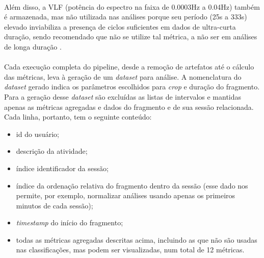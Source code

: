             \paragraph{} Além disso, a VLF (potência do espectro na faixa de 0.0003Hz a 0.04Hz) também é armazenada, mas não utilizada nas análises porque seu período (25s a 333s) elevado inviabiliza a presença de ciclos suficientes em dados de ultra-curta duração, sendo recomendado que não se utilize tal métrica, a não ser em análises de longa duração \cite{TaskForceoftheEuropeanSocietyofCardiologytheNorthAmericanSocietyofPacing1996HeartUse}.
        
           \paragraph{} Cada execução completa do pipeline, desde a remoção de artefatos até o cálculo das métricas, leva à geração de um \textit{dataset} para análise. A nomenclatura do \textit{dataset} gerado indica os parâmetros escolhidos para \textit{crop} e duração do fragmento. Para a geração desse \textit{dataset} são excluídas as listas de intervalos e mantidas apenas as métricas agregadas e dados do fragmento e de sua sessão relacionada. Cada linha, portanto, tem o seguinte conteúdo:
                \begin{itemize}
                    \item id do usuário;
                    \item descrição da atividade;
                    \item índice identificador da sessão;
                    \item índice da ordenação relativa do fragmento dentro da sessão (esse dado nos permite, por exemplo, normalizar análises usando apenas os primeiros minutos de cada sessão);
                    \item \textit{timestamp} do início do fragmento;
                    \item todas as métricas agregadas descritas acima, incluindo as que não são usadas nas classificações, mas podem ser visualizadas, num total de 12 métricas.
                \end{itemize}
                
        
        
